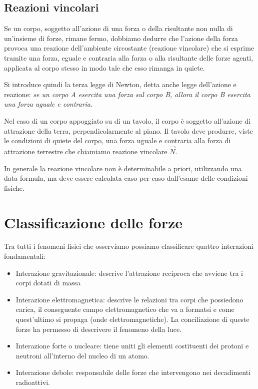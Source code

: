 \documentclass[class=book, crop=false, oneside, 12pt]{standalone}
\begin{document}
\subsection{Reazioni vincolari}

Se un corpo, soggetto all'azione di una forza o della risultante non nulla di un'insieme di forze, rimane fermo, dobbiamo dedurre che l'azione della forza provoca una reazione dell'ambiente circostante (reazione vincolare) che si esprime tramite una forza, eguale e contraria alla forza o alla risultante delle forze agenti,
applicata al corpo stesso in modo tale che esso rimanga in quiete.

Si introduce quindi la terza legge di Newton, detta anche legge dell'azione e reazione: 
\emph{se un corpo A esercita una forza sul corpo B, allora il corpo B esercita una forza uguale e contraria}.

Nel caso di un corpo appoggiato su di un tavolo, il corpo è soggetto all'azione di attrazione della terra, perpendicolarmente al piano.
Il tavolo deve produrre, viste le condizioni di quiete del corpo, una forza uguale e contraria alla forza di attrazione terrestre che chiamiamo reazione vincolare \(\overrightarrow{N}\).

In generale la reazione vincolare non è determinabile a priori, utilizzando una data formula, ma deve essere calcolata caso per caso dall'esame delle condizioni fisiche. 

\section{Classificazione delle forze}

Tra tutti i fenomeni fisici che osserviamo possiamo classificare quattro interazioni fondamentali:
\begin{itemize}
    \item Interazione gravitazionale: descrive l'attrazione reciproca che avviene tra i corpi dotati di massa
    \item Interazione elettromagnetica: descrive le relazioni tra corpi che possiedono carica, il conseguente campo elettromagnetico che va a formatsi e come quest'ultimo si propaga (onde elettromagnetiche). La conciliazione di queste forze ha permesso di descrivere il fenomeno della luce.
    \item Interazione forte o nucleare: tiene uniti gli elementi costituenti dei protoni e neutroni all'interno del nucleo di un atomo. 
    \item Interazione debole: responsabile delle forze che intervengono nei decadimenti radioattivi.
\end{itemize}
\end{document}
